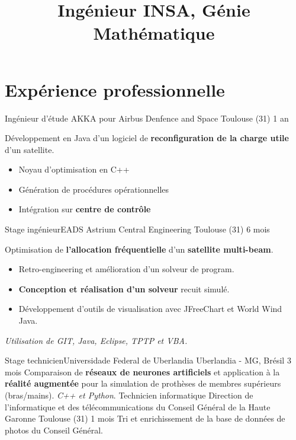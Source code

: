 \documentclass[10pt,a4paper,sans]{moderncv}%
\title{Ingénieur INSA, Génie Mathématique}
\begin{document}
\maketitle
\vspace{-1cm} %

\section{Expérience professionnelle}
    {Ingénieur d'étude}
    {AKKA pour Airbus Denfence and Space}
    {Toulouse (31)}
    {1 an}
    {
        Développement en Java d'un logiciel de \textbf{reconfiguration de la charge utile} d'un satellite.
        \begin{itemize}
            \item Noyau d'optimisation en C++
            \item Génération de procédures opérationnelles
            \item Intégration sur \textbf{centre de contrôle}
        \end{itemize}
    }
    {Stage ingénieur}{EADS Astrium Central Engineering}
    {Toulouse (31)}
    {6 mois}
    {
        Optimisation de \textbf{l'allocation fréquentielle} d'un \textbf{satellite multi-beam}.
        \begin{itemize}
            \item Retro-engineering et amélioration d'un solveur de program.
            \item \textbf{Conception et réalisation d'un solveur} recuit simulé.
            \item Développement d'outils de visualisation avec JFreeChart et World Wind Java.
        \end{itemize}
        \textit{Utilisation  de GIT, Java, Eclipse, TPTP et VBA.}
    }
    {Stage technicien}{Universidade Federal de Uberlandia}
    {Uberlandia - MG, Brésil}
    {3 mois}
    {Comparaison de \textbf{réseaux de neurones artificiels} et application à la \textbf{réalité augmentée} pour la simulation de prothèses de membres supérieurs (bras/mains). \textit{C++ et Python}.}
    {Technicien informatique}
    {Direction de l'informatique et des télécommunications du Conseil Général de la Haute Garonne}
    {Toulouse (31)}
    {1 mois}
    {Tri et enrichissement de la base de données de photos du Conseil Général.}
\end{document}
